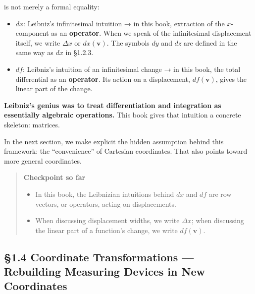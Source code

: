 \documentclass[a4paper,12pt,openany]{book}
\begin{document}
is not merely a formal equality:

\begin{itemize}
\item
  \(dx\): Leibniz's infinitesimal intuition → in this book, extraction
  of the \(x\)-component as an \textbf{operator}. When we speak of the
  infinitesimal displacement itself, we write \(\Delta x\) or
  \(dx(\mathbf{v})\). The symbols \(dy\) and \(dz\) are defined in the
  same way as \(dx\) in §1.2.3.
\item
  \(df\): Leibniz's intuition of an infinitesimal change → in this book,
  the total differential as an \textbf{operator}. Its action on a
  displacement, \(df(\mathbf{v})\), gives the linear part of the change.
\end{itemize}

\textbf{Leibniz’s genius was to treat differentiation and integration as essentially algebraic operations.}
This book gives that intuition a concrete skeleton: matrices.

In the next section, we make explicit the hidden assumption behind this
framework: the ``convenience'' of Cartesian coordinates. That also
points toward more general coordinates.

\par\vspace{0.35em}\par

\begin{quote}
\textbf{Checkpoint so far}

\begin{itemize}
\item
  In this book, the Leibnizian intuitions behind \(dx\) and \(df\) are
  row vectors, or operators, acting on displacements.
\item
  When discussing displacement widths, we write \(\Delta x\); when
  discussing the linear part of a function's change, we write
  \(df(\mathbf{v})\).
\end{itemize}
\end{quote}

\par\vspace{0.35em}\par

\hypertarget{coordinate-transformations-rebuilding-measuring-devices-in-new-coordinates}{%
\subsection{§1.4 Coordinate Transformations — Rebuilding Measuring
Devices in New
Coordinates}\label{coordinate-transformations-rebuilding-measuring-devices-in-new-coordinates}}
\end{document}
